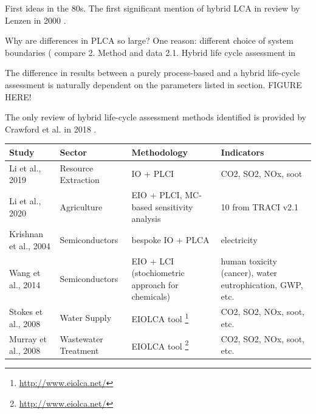 \documentclass{article}
\begin{document}
        First ideas in the 80s. The first significant mention of hybrid LCA in review by Lenzen in 2000 \cite{lenzen_errors_2000}.
            
        Why are differences in PLCA so large? One reason: different choice of system boundaries ( compare 2. Method and data 2.1. Hybrid life cycle assessment in \cite{teh_hybrid_2017}
        
        The difference in results between a purely process-based and a hybrid life-cycle assessment is naturally dependent on the parameters listed in section. FIGURE HERE!
        
        The only review of hybrid life-cycle assessment methods identified is provided by Crawford et al. in 2018 \cite{crawford_hybrid_2018}. \cite{}
        
        \begin{table}[H]
            \centering
            \begin{tabularx}{\textwidth}{| X | X | X | X |}
                \hline
                    \textbf{Study} & \textbf{Sector} & \textbf{Methodology} & \textbf{Indicators} \\
                \hline
                    Li et al., 2019 \cite{li_economic_2019} & Resource Extraction & IO + PLCI & CO2, SO2, NOx, soot \\
                \hline
                    Li et al., 2020 \cite{li_life_2020} & Agriculture & EIO + PLCI, MC-based sensitivity analysis & 10 from TRACI v2.1 \\ %
                \hline
                    Krishnan et al., 2004 \cite{krishnan_using_2004} & Semiconductors & bespoke IO + PLCA & electricity \\
                \hline
                    Wang et al., 2014 \cite{wang_hybrid_2014} & Semiconductors & EIO + LCI (stochiometric approach for chemicals) & human toxicity (cancer), water eutrophication, GWP, etc. \\
                \hline
                    Stokes et al., 2008 \cite{stokes_energy_2009} & Water Supply & EIOLCA tool \footnote{\url{http://www.eiolca.net/}} & CO2, SO2, NOx, soot, etc. \\
                \hline
                    Murray et al., 2008 \cite{murray_hybrid_2008} & Wastewater Treatment & EIOLCA tool \footnote{\url{http://www.eiolca.net/}} & CO2, SO2, NOx, soot, etc. \\

\end{tabularx}
\end{table}
\end{document}
